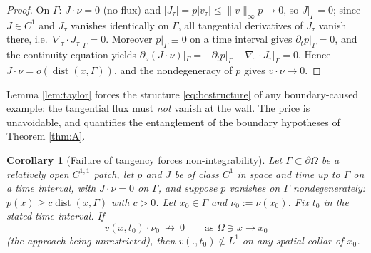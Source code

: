 \documentclass[11pt]{amsart}
\newtheorem{corollary}[theorem]{Corollary}
\theoremstyle{definition}
\begin{document}
\begin{proof}
On $\Gamma$: $J\cdot\nu=0$ (no-flux) and
$|J_\tau|=p|v_\tau|\le\|v\|_\infty p\to0$, so $J|_\Gamma=0$; since
$J\in C^1$ and $J_\tau$ vanishes identically on $\Gamma$, all
tangential derivatives of $J_\tau$ vanish there, i.e.\
$\nabla_\tau\!\cdot J_\tau|_\Gamma=0$. Moreover $p|_\Gamma\equiv0$
on a time interval gives $\partial_tp|_\Gamma=0$, and the continuity
equation yields
$\partial_\nu(J\cdot\nu)|_\Gamma=-\partial_tp|_\Gamma-
\nabla_\tau\!\cdot J_\tau|_\Gamma=0$. Hence
$J\cdot\nu=o(\operatorname{dist}(x,\Gamma))$, and the nondegeneracy
of $p$ gives $v\cdot\nu\to0$.
\end{proof}

Lemma \ref{lem:taylor} forces the structure \eqref{eq:bcstructure} of
any boundary-caused example: the tangential flux must \emph{not}
vanish at the wall. The price is unavoidable, and quantifies the
entanglement of the boundary hypotheses of Theorem \ref{thm:A}.

\begin{corollary}[Failure of tangency forces non-integrability]
\label{cor:entangled}
Let $\Gamma\subset\partial\Omega$ be a relatively open $C^{1,1}$ patch,
let $p$ and $J$ be of class $C^1$ in space and time up to $\Gamma$
on a time interval, with $J\cdot\nu=0$ on $\Gamma$, and suppose $p$
vanishes on $\Gamma$ nondegenerately:
$p(x)\ge c\operatorname{dist}(x,\Gamma)$ with $c>0$. Let
$x_0\in\Gamma$ and $\nu_0:=\nu(x_0)$.
Fix $t_0$ 
 in the stated time interval. If
\[
v(x,t_0)\cdot\nu_0\ \not\longrightarrow\ 0
\qquad\text{as }\Omega\ni x\to x_0
\]
\emph{(}the approach being unrestricted\emph{)}, then $v(.,t_0)\notin L^1$
on any spatial collar of $x_0$.
\end{corollary}
\end{document}
